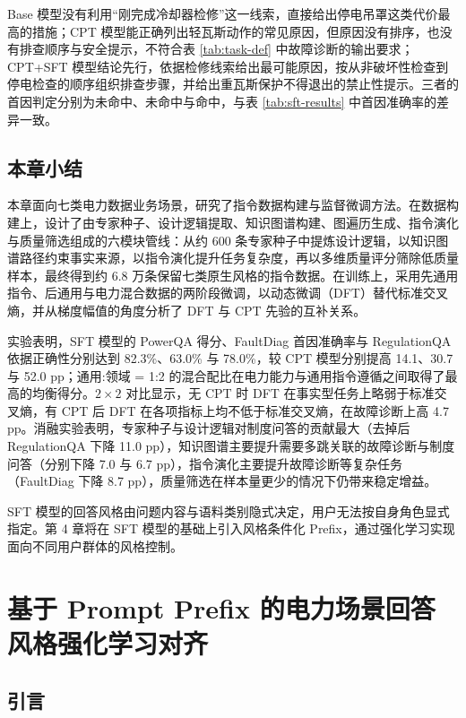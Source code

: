 \documentclass[fontset=fandol,type=master,campus=shenzhen,etitleauto=true]{hithesisbook}
\begin{document}
Base 模型没有利用“刚完成冷却器检修”这一线索，直接给出停电吊罩这类代价最高的措施；CPT 模型能正确列出轻瓦斯动作的常见原因，但原因没有排序，也没有排查顺序与安全提示，不符合表 \ref{tab:task-def} 中故障诊断的输出要求；CPT+SFT 模型结论先行，依据检修线索给出最可能原因，按从非破坏性检查到停电检查的顺序组织排查步骤，并给出重瓦斯保护不得退出的禁止性提示。三者的首因判定分别为未命中、未命中与命中，与表 \ref{tab:sft-results} 中首因准确率的差异一致。

\section{本章小结}\label{sec:ch3-summary}

本章面向七类电力数据业务场景，研究了指令数据构建与监督微调方法。在数据构建上，设计了由专家种子、设计逻辑提取、知识图谱构建、图遍历生成、指令演化与质量筛选组成的六模块管线：从约 600 条专家种子中提炼设计逻辑，以知识图谱路径约束事实来源，以指令演化提升任务复杂度，再以多维质量评分筛除低质量样本，最终得到约 6.8 万条保留七类原生风格的指令数据。在训练上，采用先通用指令、后通用与电力混合数据的两阶段微调，以动态微调（DFT）替代标准交叉熵，并从梯度幅值的角度分析了 DFT 与 CPT 先验的互补关系。

实验表明，SFT 模型的 PowerQA 得分、FaultDiag 首因准确率与 RegulationQA 依据正确性分别达到 82.3\%、63.0\% 与 78.0\%，较 CPT 模型分别提高 14.1、30.7 与 52.0 pp；通用:领域 = 1:2 的混合配比在电力能力与通用指令遵循之间取得了最高的均衡得分。$2 \times 2$ 对比显示，无 CPT 时 DFT 在事实型任务上略弱于标准交叉熵，有 CPT 后 DFT 在各项指标上均不低于标准交叉熵，在故障诊断上高 4.7 pp。消融实验表明，专家种子与设计逻辑对制度问答的贡献最大（去掉后 RegulationQA 下降 11.0 pp），知识图谱主要提升需要多跳关联的故障诊断与制度问答（分别下降 7.0 与 6.7 pp），指令演化主要提升故障诊断等复杂任务（FaultDiag 下降 8.7 pp），质量筛选在样本量更少的情况下仍带来稳定增益。

SFT 模型的回答风格由问题内容与语料类别隐式决定，用户无法按自身角色显式指定。第 4 章将在 SFT 模型的基础上引入风格条件化 Prefix，通过强化学习实现面向不同用户群体的风格控制。

\chapter{基于 Prompt Prefix 的电力场景回答风格强化学习对齐}\label{ux57faux4e8e-prompt-prefix-ux7684ux7535ux529bux573aux666fux56deux7b54ux98ceux683cux5f3aux5316ux5b66ux4e60ux5bf9ux9f50}

\section{引言}\label{ux7814ux7a76ux52a8ux673a-1}
\end{document}
